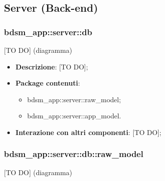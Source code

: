 %
%


\subsection{Server (Back-end)} %
\label{sub:server}
  \subsubsection{bdsm\_app::server::db} %
  \label{ssub:bdsm_app_server_db}
  [TO DO] (diagramma) \newline \newline

  \begin{itemize}
    \item \textbf{Descrizione}: [TO DO];
    \item \textbf{Package contenuti}:
      \begin{itemize}
        \item bdsm\_app::server::raw\_model;
        \item bdsm\_app::server::app\_model.
      \end{itemize}
    \item \textbf{Interazione con altri componenti}: [TO DO];
  \end{itemize}



  \subsubsection{bdsm\_app::server::db::raw\_model} %
  \label{ssub:bdsm_app_server_raw_model}
  [TO DO] (diagramma) \newline \newline

